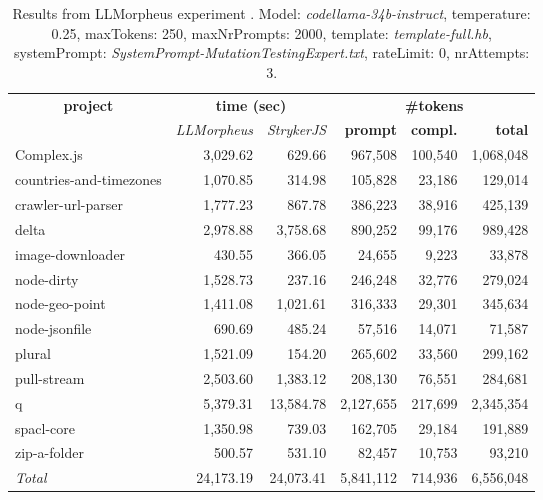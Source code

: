 
\begin{table*}[hbt!]
\centering
{\scriptsize
\begin{tabular}{l||r|r|r|r|r}
\multicolumn{1}{c|}{\bf project} & \multicolumn{2}{|c|}{\bf time (sec)} & \multicolumn{3}{|c|}{\bf \#tokens} \\
               & {\it LLMorpheus} & {\it StrykerJS} & {\bf prompt} & {\bf compl.} & {\bf total} \\
\hline
  Complex.js & 3,029.62 & 629.66 & 967,508 & 100,540 & 1,068,048 \\ 
countries-and-timezones & 1,070.85 & 314.98 & 105,828 & 23,186 & 129,014 \\ 
crawler-url-parser & 1,777.23 & 867.78 & 386,223 & 38,916 & 425,139 \\ 
delta & 2,978.88 & 3,758.68 & 890,252 & 99,176 & 989,428 \\ 
image-downloader & 430.55 & 366.05 & 24,655 & 9,223 & 33,878 \\ 
node-dirty & 1,528.73 & 237.16 & 246,248 & 32,776 & 279,024 \\ 
node-geo-point & 1,411.08 & 1,021.61 & 316,333 & 29,301 & 345,634 \\ 
node-jsonfile & 690.69 & 485.24 & 57,516 & 14,071 & 71,587 \\ 
plural & 1,521.09 & 154.20 & 265,602 & 33,560 & 299,162 \\ 
pull-stream & 2,503.60 & 1,383.12 & 208,130 & 76,551 & 284,681 \\ 
q & 5,379.31 & 13,584.78 & 2,127,655 & 217,699 & 2,345,354 \\ 
spacl-core & 1,350.98 & 739.03 & 162,705 & 29,184 & 191,889 \\ 
zip-a-folder & 500.57 & 531.10 & 82,457 & 10,753 & 93,210 \\ 
\hline
  \textit{Total} & 24,173.19 & 24,073.41 & 5,841,112 & 714,936 & 6,556,048 \\
  \end{tabular}
  }
  \\[2mm]
  \caption{Results from LLMorpheus experiment .
    Model: \textit{codellama-34b-instruct}, 
    temperature: 0.25, 
    maxTokens: 250, 
    maxNrPrompts: 2000, 
    template: \textit{template-full.hb}, 
    systemPrompt: \textit{SystemPrompt-MutationTestingExpert.txt}, 
    rateLimit: 0, 
    nrAttempts: 3.  
  }
  \label{table:Cost:run350:codellama-34b-instruct:template-full.hb:0.25}
\end{table*}